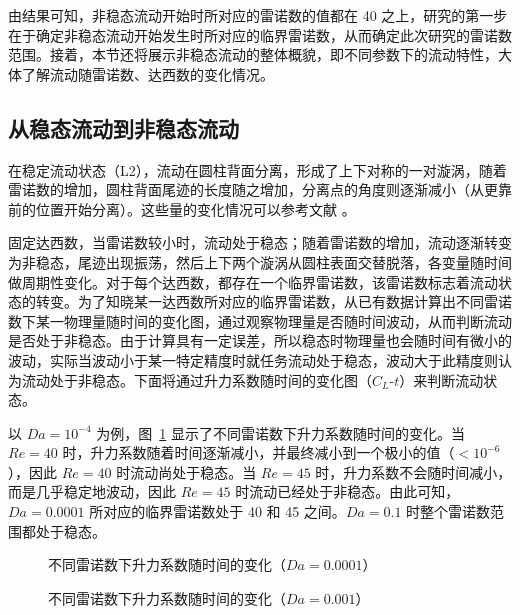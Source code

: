 由结果可知，非稳态流动开始时所对应的雷诺数的值都在 40 之上，研究的第一步在于确定非稳态流动开始发生时所对应的临界雷诺数，从而确定此次研究的雷诺数范围。接着，本节还将展示非稳态流动的整体概貌，即不同参数下的流动特性，大体了解流动随雷诺数、达西数的变化情况。

\subsection{从稳态流动到非稳态流动}

在稳定流动状态（L2），流动在圆柱背面分离，形成了上下对称的一对漩涡，随着雷诺数的增加，圆柱背面尾迹的长度随之增加，分离点的角度则逐渐减小（从更靠前的位置开始分离）。这些量的变化情况可以参考文献 \cite{}。

固定达西数，当雷诺数较小时，流动处于稳态；随着雷诺数的增加，流动逐渐转变为非稳态，尾迹出现振荡，然后上下两个漩涡从圆柱表面交替脱落，各变量随时间做周期性变化。对于每个达西数，都存在一个临界雷诺数，该雷诺数标志着流动状态的转变。为了知晓某一达西数所对应的临界雷诺数，从已有数据计算出不同雷诺数下某一物理量随时间的变化图，通过观察物理量是否随时间波动，从而判断流动是否处于非稳态。由于计算具有一定误差，所以稳态时物理量也会随时间有微小的波动，实际当波动小于某一特定精度时就任务流动处于稳态，波动大于此精度则认为流动处于非稳态。下面将通过升力系数随时间的变化图（$C_L$-$t$）来判断流动状态。

以 $Da=10^{-4}$ 为例，图~\ref{fig: Cl_t-1e-4} 显示了不同雷诺数下升力系数随时间的变化。当 $Re=40$ 时，升力系数随着时间逐渐减小，并最终减小到一个极小的值（$<10^{-6}$），因此 $Re=40$ 时流动尚处于稳态。当 $Re=45$ 时，升力系数不会随时间减小，而是几乎稳定地波动，因此 $Re=45$ 时流动已经处于非稳态。由此可知，$Da=0.0001$ 所对应的临界雷诺数处于 40 和 45 之间。$Da=0.1$ 时整个雷诺数范围都处于稳态。

\begin{figure}
	\setlength{\subfigcapskip}{-1bp}
	\centering
	\begin{minipage}{\textwidth}
		\centering
	\end{minipage}
	\vspace{0.2em}
	\caption{不同雷诺数下升力系数随时间的变化（$Da=0.0001$）}
	\label{fig: Cl_t-1e-4}
\end{figure}

\begin{figure}
	\setlength{\subfigcapskip}{-1bp}
	\centering
	\begin{minipage}{\textwidth}
		\centering
	\end{minipage}
	\vspace{0.2em}
	\caption{不同雷诺数下升力系数随时间的变化（$Da=0.001$）}
	\label{fig: Cl_t-1e-3}
\end{figure}

